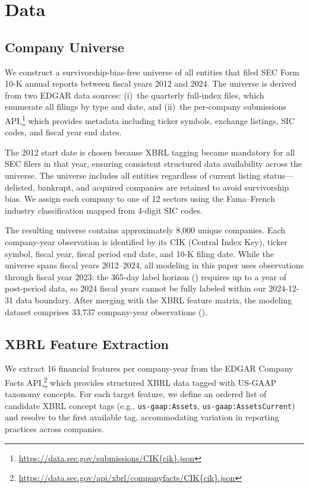 \section{Data}
\label{sec:data}

\subsection{Company Universe}
\label{sec:universe}

We construct a survivorship-bias-free universe of all entities that filed SEC Form 10-K annual reports between fiscal years 2012 and 2024. The universe is derived from two EDGAR data sources: (i)~the quarterly full-index files, which enumerate all filings by type and date, and (ii)~the per-company submissions API,\footnote{\url{https://data.sec.gov/submissions/CIK\{cik\}.json}} which provides metadata including ticker symbols, exchange listings, SIC codes, and fiscal year end dates.

The 2012 start date is chosen because XBRL tagging became mandatory for all SEC filers in that year, ensuring consistent structured data availability across the universe. The universe includes all entities regardless of current listing status---delisted, bankrupt, and acquired companies are retained to avoid survivorship bias. We assign each company to one of 12 sectors using the Fama--French industry classification mapped from 4-digit SIC codes.

The resulting universe contains approximately 8{,}000 unique companies. Each company-year observation is identified by its CIK (Central Index Key), ticker symbol, fiscal year, fiscal period end date, and 10-K filing date. While the universe spans fiscal years 2012--2024, all modeling in this paper uses observations through fiscal year 2023: the 365-day label horizon () requires up to a year of post-period data, so 2024 fiscal years cannot be fully labeled within our 2024-12-31 data boundary. After merging with the XBRL feature matrix, the modeling dataset comprises 33{,}737 company-year observations ().

\subsection{XBRL Feature Extraction}
\label{sec:xbrl}

We extract 16 financial features per company-year from the EDGAR Company Facts API,\footnote{\url{https://data.sec.gov/api/xbrl/companyfacts/CIK\{cik\}.json}} which provides structured XBRL data tagged with US-GAAP taxonomy concepts. For each target feature, we define an ordered list of candidate XBRL concept tags (e.g., \texttt{us-gaap:Assets}, \texttt{us-gaap:AssetsCurrent}) and resolve to the first available tag, accommodating variation in reporting practices across companies.

